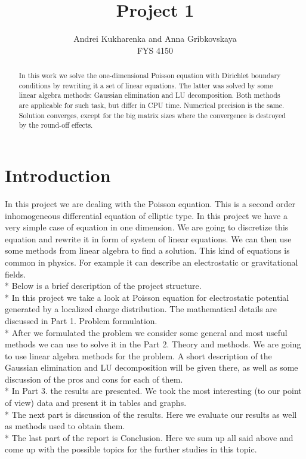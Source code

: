 \documentclass[10pt]{article}
\begin{document}
\setlength\parindent{1pt}
\title{Project 1}
\author{Andrei Kukharenka and Anna Gribkovskaya \\  
FYS 4150 
}

\maketitle
\begin{abstract}
In this work we solve the one-dimensional Poisson equation with Dirichlet boundary conditions by rewriting it a set of linear equations. The latter was solved by some linear algebra methods: Gaussian elimination and LU decomposition. Both methods are applicable for such task, but differ in CPU time. Numerical precision is the same. Solution converges, except for the big matrix sizes where the convergence is destroyed by the round-off effects.
\end{abstract}
\clearpage 


\section{Introduction}
In this project we are dealing with the Poisson equation. This is a second order inhomogeneous differential equation of elliptic type. In this project we have a very simple case of equation in one dimension. We are going to discretize this equation and rewrite it in form of system of linear equations. We can then use some methods from linear algebra to find a solution. This kind of equations is common in physics. For example it can describe an electrostatic or gravitational fields.  \\* 
Below is a brief description of the project structure. \\* 
In this project we take a look at Poisson equation for electrostatic potential generated by a localized charge distribution. The mathematical details are discussed in Part 1. Problem formulation.\\* 
After we formulated the problem we consider some general and most useful methods we can use to solve it in the Part 2. Theory and methods. We are going to use linear algebra methods for the problem. A short description of the Gaussian elimination and LU decomposition will be given there, as well as some discussion of the pros and cons for each of them.\\* 
In Part 3. the results are presented. We took the most interesting (to our point of view) data and present it in tables and graphs. \\* 
The next part is discussion of the results. Here we evaluate our results as well as methods used to obtain them. \\* 
The last part of the report is Conclusion. Here we sum up all said above and come up with the possible topics for the further studies  in this topic. 
\end{document}
